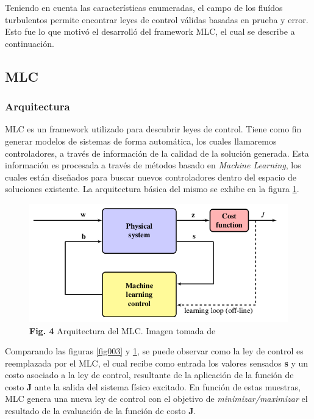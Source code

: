 \documentclass[a4paper,10pt]{article}
\begin{document}
        Teniendo en cuenta las características enumeradas, el campo de los fluídos turbulentos permite encontrar leyes de control válidas
        basadas en prueba y error. Esto fue lo que motivó el desarrolló del framework MLC, el cual se describe a continuación.

    \subsection{MLC} \label{sec:mlc}
    \subsubsection{Arquitectura}
        MLC es un framework utilizado para descubrir leyes de control. Tiene como fin generar modelos de sistemas de forma automática,
        los cuales llamaremos controladores, a través de información de la calidad de la solución generada. Esta información es procesada
        a través de métodos basado en \textit{Machine Learning}, los cuales están diseñados para buscar nuevos controladores dentro del
        espacio de soluciones existente. La arquitectura básica del mismo se exhibe en la figura \ref{fig004}.

        \begin{figure}[!Hhtb]
            \centering
            \includegraphics[width=12cm,origin=c]{Imagenes/MLC_architecture.png}
            \caption{\textbf{Fig. 4} Arquitectura del MLC. Imagen tomada de \cite{Duriez2016}} \label{fig004}
        \end{figure}

        \indent Comparando las figuras \ref{fig003} y \ref{fig004}, se puede observar como la ley de control es reemplazada por el MLC, 
        el cual recibe como entrada los valores sensados \textbf{s} y un costo asociado a la ley de control, resultante de la aplicación 
        de la función de costo \textbf{J} ante la salida del sistema físico excitado. En función de estas muestras, MLC genera una nueva 
        ley de control con el objetivo de \textit{minimizar/maximizar} el resultado de la evaluación de la función de costo 
        \textbf{J}.
\end{document}
